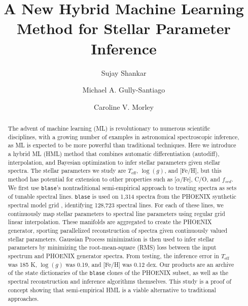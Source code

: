 \documentclass[twocolumn, linenumbers]{aastex631}
\begin{document}
\title{A New Hybrid Machine Learning Method for Stellar Parameter Inference}
\author[0000-0002-2290-6810]{Sujay Shankar}
\author[0000-0002-4020-3457]{Michael A. Gully-Santiago}
\author[0000-0002-4404-0456]{Caroline V. Morley}


\begin{abstract}
    The advent of machine learning (ML) is revolutionary to numerous scientific disciplines, with a growing number of examples in astronomical spectroscopic inference, as ML is expected to be more powerful than traditional techniques.
    Here we introduce a hybrid ML (HML) method that combines automatic differentiation (autodiff), interpolation, and Bayesian optimization to infer stellar parameters given stellar spectra.
    The stellar parameters we study are $T_{\mathrm{eff}}$, $\log(g)$, and [Fe/H], but this method has potential for extension to other properties such as [$\alpha$/Fe], C/O, and $f_{sed}$.
    We first use \texttt{blase}'s \citep{blase} nontraditional semi-empirical approach to treating spectra as sets of tunable spectral lines. 
    \texttt{blase} is used on 1,314 spectra from the PHOENIX synthetic spectral model grid \citep{PHOENIX}, identifying 128,723 spectral lines.
    For each of these lines, we continuously map stellar parameters to spectral line parameters using regular grid linear interpolation.
    These manifolds are aggregated to create the PHOENIX generator, sporting parallelized reconstruction of spectra given continuously valued stellar parameters.
    Gaussian Process minimization is then used to infer stellar parameters by minimizing the root-mean-square (RMS) loss between the input spectrum and PHOENIX generator spectra.
    From testing, the inference error in $T_{\mathrm{eff}}$ was 185 K, $\log(g)$ was 0.19, and [Fe/H] was 0.12 dex.
    Our products are an archive of the state dictionaries of the \texttt{blase} clones of the PHOENIX subset, as well as the spectral reconstruction and inference algorithms themselves.
    This study is a proof of concept showing that semi-empirical HML is a viable alternative to traditional approaches.
\end{abstract}
\end{document}

